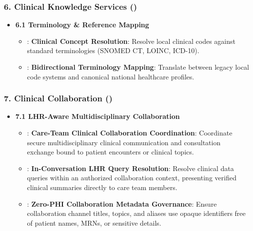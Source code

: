 \subsubsection*{6. Clinical Knowledge Services (\texttt{})}
\label{rad:enabling:637}

\begin{itemize}

\item
\textbf{6.1 Terminology \& Reference Mapping}


\begin{itemize}

\item
\texttt{}: \textbf{Clinical Concept Resolution}: Resolve local clinical codes against standard terminologies (SNOMED CT, LOINC, ICD-10).



\item
\texttt{}: \textbf{Bidirectional Terminology Mapping}: Translate between legacy local code systems and canonical national healthcare profiles.



\end{itemize}


\end{itemize}
\label{rad:enabling:641}
\subsubsection*{7. Clinical Collaboration (\texttt{})}
\label{rad:enabling:642}

\begin{itemize}

\item
\textbf{7.1 LHR-Aware Multidisciplinary Collaboration}


\begin{itemize}

\item
\texttt{}: \textbf{Care-Team Clinical Collaboration Coordination}: Coordinate secure multidisciplinary clinical communication and consultation exchange bound to patient encounters or clinical topics.



\item
\texttt{}: \textbf{In-Conversation LHR Query Resolution}: Resolve clinical data queries within an authorized collaboration context, presenting verified clinical summaries directly to care team members.



\item
\texttt{}: \textbf{Zero-PHI Collaboration Metadata Governance}: Ensure collaboration channel titles, topics, and aliases use opaque identifiers free of patient names, MRNs, or sensitive details.



\end{itemize}


\end{itemize}
\label{rad:enabling:647}
